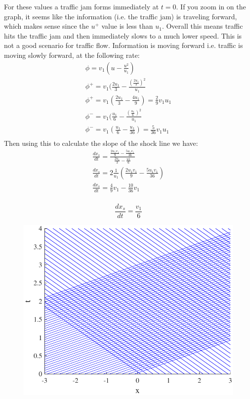 \documentclass{article}
\begin{document}
For these values a traffic jam forms immediately at $t=0$. If you zoom in on the graph, it seems like the information (i.e. the traffic jam) is traveling forward, which makes sense since the $u^+$ value is less than $u_1$. Overall this means traffic hits the traffic jam and then immediately slows to a much lower speed. This is not a good scenario for traffic flow. Information is moving forward i.e. traffic is moving slowly forward, at the following rate:
\begin{equation}
\begin{aligned}
\phi = v_1(u - \frac{u^2}{u_1})\\
\phi^+ = v_1(\frac{2u_1}{3} - \frac{(\frac{2u_1}{3})^2}{u_1}\\
\phi^+ = v_1(\frac{2u_1}{3} - \frac{4u_1}{9}) = \frac{2}{9}v_1u_1\\
\phi^- = v_1(\frac{u_1}{6} - \frac{(\frac{u_1}{6})^2}{u_1}\\
\phi^- = v_1(\frac{u_1}{6} - \frac{u_1}{36}) = \frac{5}{36}v_1u_1\\
\end{aligned}
\end{equation}
Then using this to calculate the slope of the shock line we have:
\begin{equation}
\begin{aligned}
\frac{dx_s}{dt} = \frac{\frac{2u_1v_1}{9} - \frac{5u_1v_1}{36}}{\frac{2u_1}{3} - \frac{u1}{6}}\\
\frac{dx_s}{dt} = 2\frac{1}{u_1}( \frac{2u_1v_1}{9} - \frac{5u_1v_1}{36})\\
\frac{dx_s}{dt} = \frac{4}{9}v_1 - \frac{10}{36}v_1\\
\end{aligned}
\end{equation}
\begin{tcolorbox}[minipage,colback=white,arc=0pt,outer arc=0pt]
\begin{equation}
\frac{dx_s}{dt} = \frac{v_1}{6}
\end{equation}
\end{tcolorbox}
\begin{figure}[!htbp]
  \centering
    \includegraphics[width=.49\textwidth]{hw_14_plot15.pdf}
    \caption{}
\end{figure}
\FloatBarrier
\end{document}
